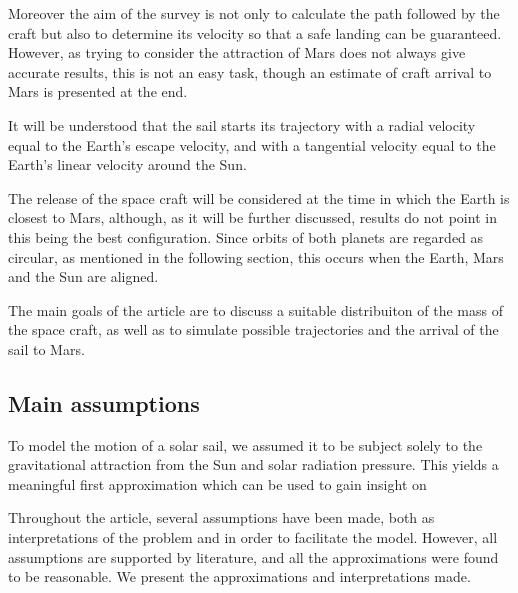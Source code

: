 \documentclass[twocolumn,12pt,a4paper]{article}
\numberwithin{equation}{section}
\begin{document}
  Moreover the aim of the survey is not only to calculate the path followed by the craft but also to determine its velocity so that a safe landing can be guaranteed. However, as trying to consider the attraction of Mars does not always give accurate results, this is not an easy task, though an estimate of craft arrival to Mars is presented at the end.
 
 It will be understood that the sail starts its trajectory with a radial velocity equal to the Earth's escape velocity, and with a tangential velocity equal to the Earth's linear velocity around the Sun. 
 
The release of the space craft will be considered at the time in which the Earth is closest to Mars, although, as it will be further discussed, results do not point in this being the best configuration. Since orbits of both planets are regarded as circular, as mentioned in the following section, this occurs when the Earth, Mars and the Sun are aligned.

The main goals of the article are to discuss a suitable distribuiton of the mass of the space craft, as well as to simulate possible trajectories and the arrival of the sail to Mars.

\subsection{Main assumptions}
To model the motion of a solar sail, we assumed it to be subject solely to the gravitational attraction from the Sun and solar radiation pressure. This yields a meaningful first approximation which can be used to gain insight on 

Throughout the article, several assumptions have been made, both as interpretations of the problem and in order to facilitate the model. However, all assumptions are supported by literature, and all the approximations were found to be reasonable. We present the approximations and interpretations made.
\end{document}
